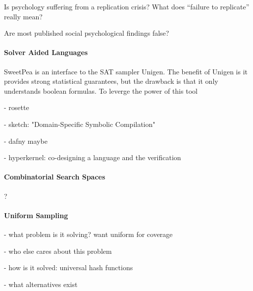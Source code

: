 Is psychology suffering from a replication crisis? What does “failure to replicate” really mean? \cite{maxwell2015psychology}

Are most published social psychological findings false? \cite{stroebe2016most}


\paragraph*{Solver Aided Languages}

SweetPea is an interface to the SAT sampler Unigen. The benefit of Unigen is it provides strong statistical guarantees, but the drawback is that it only understands boolean formulas. To leverge the power of this tool

- rosette \cite{torlak2014lightweight}

- sketch: "Domain-Specific Symbolic Compilation" \cite{bodik2017domain}

- dafny maybe \cite{leino2013developing}

- hyperkernel: co-designing a language and the verification \cite{nelson2017hyperkernel}


\paragraph*{Combinatorial Search Spaces}
?


\paragraph*{Uniform Sampling}

\cite{meel2016constrained}

- what problem is it solving? want uniform for coverage

- who else cares about this problem

- how is it solved: universal hash functions

- what alternatives exist
